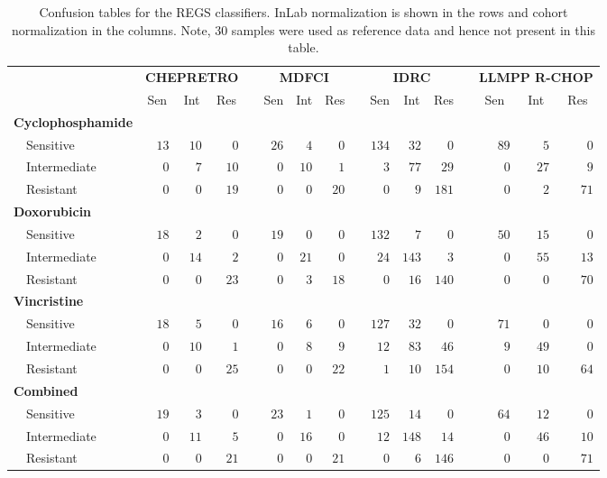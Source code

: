 \begin{table}[!tbp]
{\small
\caption{Confusion tables for the REGS classifiers.
InLab normalization is shown in the rows and cohort normalization in
the columns. Note, 30 samples were used as reference data and hence not present
in this table.\label{tab:confusiondrugreference}} 
\begin{center}
\begin{tabular}{lrrrcrrrcrrrcrrr}
\hline\hline
\multicolumn{1}{l}{\bfseries }&\multicolumn{3}{c}{\bfseries CHEPRETRO}&\multicolumn{1}{c}{\bfseries }&\multicolumn{3}{c}{\bfseries MDFCI}&\multicolumn{1}{c}{\bfseries }&\multicolumn{3}{c}{\bfseries IDRC}&\multicolumn{1}{c}{\bfseries }&\multicolumn{3}{c}{\bfseries LLMPP R-CHOP}\tabularnewline
\cline{2-4} \cline{6-8} \cline{10-12} \cline{14-16}
\multicolumn{1}{l}{}&\multicolumn{1}{c}{Sen}&\multicolumn{1}{c}{Int}&\multicolumn{1}{c}{Res}&\multicolumn{1}{c}{}&\multicolumn{1}{c}{Sen}&\multicolumn{1}{c}{Int}&\multicolumn{1}{c}{Res}&\multicolumn{1}{c}{}&\multicolumn{1}{c}{Sen}&\multicolumn{1}{c}{Int}&\multicolumn{1}{c}{Res}&\multicolumn{1}{c}{}&\multicolumn{1}{c}{Sen}&\multicolumn{1}{c}{Int}&\multicolumn{1}{c}{Res}\tabularnewline
\hline
{\bfseries Cyclophosphamide}&&&&&&&&&&&&&&&\tabularnewline
~~Sensitive&$13$&$10$&$ 0$&&$26$&$ 4$&$ 0$&&$134$&$ 32$&$  0$&&$89$&$ 5$&$ 0$\tabularnewline
~~Intermediate&$ 0$&$ 7$&$10$&&$ 0$&$10$&$ 1$&&$  3$&$ 77$&$ 29$&&$ 0$&$27$&$ 9$\tabularnewline
~~Resistant&$ 0$&$ 0$&$19$&&$ 0$&$ 0$&$20$&&$  0$&$  9$&$181$&&$ 0$&$ 2$&$71$\tabularnewline
\hline
{\bfseries Doxorubicin}&&&&&&&&&&&&&&&\tabularnewline
~~Sensitive&$18$&$ 2$&$ 0$&&$19$&$ 0$&$ 0$&&$132$&$  7$&$  0$&&$50$&$15$&$ 0$\tabularnewline
~~Intermediate&$ 0$&$14$&$ 2$&&$ 0$&$21$&$ 0$&&$ 24$&$143$&$  3$&&$ 0$&$55$&$13$\tabularnewline
~~Resistant&$ 0$&$ 0$&$23$&&$ 0$&$ 3$&$18$&&$  0$&$ 16$&$140$&&$ 0$&$ 0$&$70$\tabularnewline
\hline
{\bfseries Vincristine}&&&&&&&&&&&&&&&\tabularnewline
~~Sensitive&$18$&$ 5$&$ 0$&&$16$&$ 6$&$ 0$&&$127$&$ 32$&$  0$&&$71$&$ 0$&$ 0$\tabularnewline
~~Intermediate&$ 0$&$10$&$ 1$&&$ 0$&$ 8$&$ 9$&&$ 12$&$ 83$&$ 46$&&$ 9$&$49$&$ 0$\tabularnewline
~~Resistant&$ 0$&$ 0$&$25$&&$ 0$&$ 0$&$22$&&$  1$&$ 10$&$154$&&$ 0$&$10$&$64$\tabularnewline
\hline
{\bfseries Combined}&&&&&&&&&&&&&&&\tabularnewline
~~Sensitive&$19$&$ 3$&$ 0$&&$23$&$ 1$&$ 0$&&$125$&$ 14$&$  0$&&$64$&$12$&$ 0$\tabularnewline
~~Intermediate&$ 0$&$11$&$ 5$&&$ 0$&$16$&$ 0$&&$ 12$&$148$&$ 14$&&$ 0$&$46$&$10$\tabularnewline
~~Resistant&$ 0$&$ 0$&$21$&&$ 0$&$ 0$&$21$&&$  0$&$  6$&$146$&&$ 0$&$ 0$&$71$\tabularnewline
\hline
\end{tabular}\end{center}}

\end{table}
